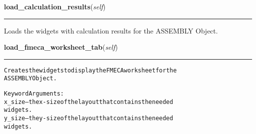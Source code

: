 \hspace{.8\funcindent}\begin{boxedminipage}{\funcwidth}

    \raggedright \textbf{load\_calculation\_results}(\textit{self})

    \vspace{-1.5ex}

    \rule{\textwidth}{0.5\fboxrule}
\setlength{\parskip}{2ex}
    Loads the widgets with calculation results for the ASSEMBLY Object.

\setlength{\parskip}{1ex}
    \end{boxedminipage}

    \label{reliafree:assembly:Assembly:load_fmeca_worksheet_tab}

    \vspace{0.5ex}

\hspace{.8\funcindent}\begin{boxedminipage}{\funcwidth}

    \raggedright \textbf{load\_fmeca\_worksheet\_tab}(\textit{self})

    \vspace{-1.5ex}

    \rule{\textwidth}{0.5\fboxrule}
\setlength{\parskip}{2ex}
\begin{alltt}
Creates the widgets to display the FMECA worksheet for the
ASSEMBLY Object.

Keyword Arguments:
x\_size -- the x-size of the layout that contains the needed
          widgets.
y\_size -- the y-size of the layout that contains the needed
          widgets.
\end{alltt}

\setlength{\parskip}{1ex}
    \end{boxedminipage}

    \label{reliafree:assembly:Assembly:load_vandv_tab}

    \vspace{0.5ex}

